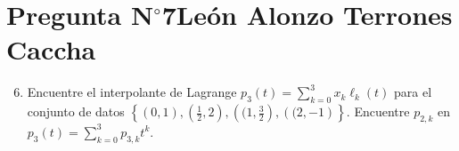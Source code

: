 \section{Pregunta N$^{\circ}$7\qquad León Alonzo Terrones Caccha}


% 

\begin{frame}
	\begin{enumerate}\setcounter{enumi}{5}
		\item

		      Encuentre el interpolante de Lagrange
		      \begin{math}
			      p_{3}\left(t\right)=
			      \sum\limits_{k=0}^{3}
			      x_{k}
			      \ell_{k}\left(t\right)
		      \end{math}
		      para el conjunto de datos
		      \begin{math}
			      \left\{
			      \left(0,1\right),
			      \left(\frac{1}{2},2\right),
			      \left((1,\frac{3}{2}\right),
                    \left((2,-1\right)
			      \right\}
		      \end{math}.
		      Encuentre $p_{2,k}$ en
		      \begin{math}
			      p_{3}\left(t\right)=
			      \sum\limits_{k=0}^{3}
			      p_{3,k}t^{k}
		      \end{math}.
	\end{enumerate}


\end{frame}
